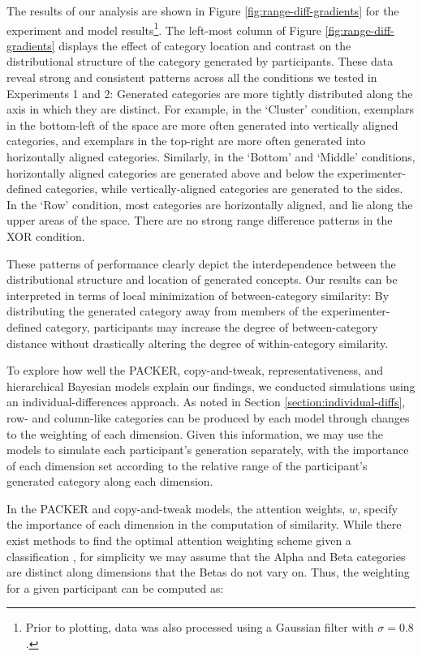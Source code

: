 \documentclass[12pt]{article}
\begin{document}
\begin{flushleft}
The results of our analysis are shown in Figure \ref{fig:range-diff-gradients}
for the experiment and model results\footnote{Prior to plotting, data was also
processed using a Gaussian filter with $\sigma = 0.8$.}. The left-most column of
Figure \ref{fig:range-diff-gradients} displays the effect of category location
and contrast on the distributional structure of the category generated by
participants. These data reveal strong and consistent patterns across all the
conditions we tested in Experiments 1 and 2: Generated categories are more
tightly distributed along the axis in which they are distinct. For example, in
the `Cluster' condition, exemplars in the bottom-left of the space are more
often generated into vertically aligned categories, and exemplars in the
top-right are more often generated into horizontally aligned categories.
Similarly, in the `Bottom' and `Middle' conditions, horizontally aligned
categories are generated above and below the experimenter-defined categories,
while vertically-aligned categories are generated to the sides. In the `Row'
condition, most categories are horizontally aligned, and lie along the upper
areas of the space. There are no strong range difference patterns in the XOR
condition.

These patterns of performance clearly depict the interdependence between the
distributional structure and location of generated concepts. Our results can be
interpreted in terms of local minimization of between-category similarity: By
distributing the generated category away from members of the
experimenter-defined category, participants may increase the degree of
between-category distance without drastically altering the degree of
within-category similarity.

To explore how well the PACKER, copy-and-tweak, representativeness, and
hierarchical Bayesian models explain our findings, we conducted simulations
using an individual-differences approach. As noted in Section
\ref{section:individual-diffs}, row- and column-like categories can be produced
by each model through changes to the weighting of each dimension. Given this
information, we may use the models to simulate each participant's generation
separately, with the importance of each dimension set according to the relative
range of the participant's generated category along each dimension.

In the PACKER and copy-and-tweak models, the attention weights, $w$, specify the
importance of each dimension in the computation of similarity. While there exist
methods to find the optimal attention weighting scheme given a classification
\citep[see][]{vanpaemel2012using}, for simplicity we may assume that the Alpha
and Beta categories are distinct along dimensions that the Betas do not vary on.
Thus, the weighting for a given participant can be computed as:


\end{flushleft}
\end{document}
